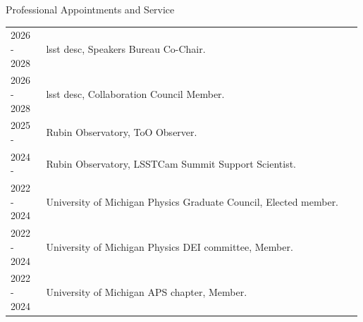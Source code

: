 \begin{rSection}{Professional Appointments and Service}
    \setlength{\extrarowheight}{3pt}
\begin{longtable}{p{0.1\linewidth}p{0.89\linewidth}}
     2026 - 2028 & \ac{lsst} \ac{desc}, Speakers Bureau Co-Chair. \\
     2026 - 2028 & \ac{lsst} \ac{desc}, Collaboration Council Member. \\
     2025 -  & Rubin Observatory, \ac{ToO} Observer. \\
     2024 -   & Rubin Observatory, \ac{LSSTCam} Summit Support Scientist. \\
     2022 - 2024 & University of Michigan Physics Graduate Council, Elected member. \\
     2022 - 2024 & University of Michigan Physics DEI committee, Member.\\
     2022 - 2024 & University of Michigan APS chapter, Member.\\
\end{longtable}
\end{rSection}
